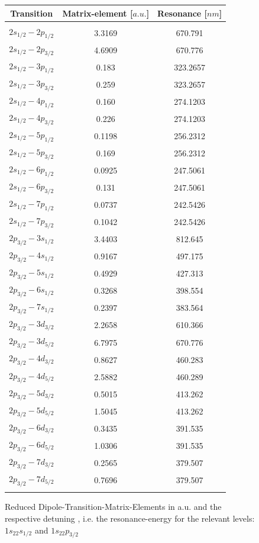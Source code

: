 \begin{figure}[H]
\begin{center}
\begin{tabular}{ccc}
Transition&Matrix-element [$\unit{a.u.}$]&Resonance [$\unit{nm}$]\\\hline\hline\\
$2s_{1/2}-2p_{1/2}$&3.3169&670.791\\
$2s_{1/2}-2p_{3/2}$&4.6909&670.776\\
$2s_{1/2}-3p_{1/2}$&0.183&323.2657\\
$2s_{1/2}-3p_{3/2}$&0.259&323.2657\\
$2s_{1/2}-4p_{1/2}$&0.160&274.1203\\
$2s_{1/2}-4p_{3/2}$&0.226&274.1203\\
$2s_{1/2}-5p_{1/2}$&0.1198&256.2312\\
$2s_{1/2}-5p_{3/2}$&0.169&256.2312\\
$2s_{1/2}-6p_{1/2}$&0.0925&247.5061\\
$2s_{1/2}-6p_{3/2}$&0.131&247.5061\\
$2s_{1/2}-7p_{1/2}$&0.0737&242.5426\\
$2s_{1/2}-7p_{3/2}$&0.1042&242.5426\\
$2p_{3/2}-3s_{1/2}$&3.4403&812.645\\
$2p_{3/2}-4s_{1/2}$&0.9167&497.175\\
$2p_{3/2}-5s_{1/2}$&0.4929&427.313\\
$2p_{3/2}-6s_{1/2}$&0.3268&398.554\\
$2p_{3/2}-7s_{1/2}$&0.2397&383.564\\
$2p_{3/2}-3d_{3/2}$&2.2658&610.366\\
$2p_{3/2}-3d_{5/2}$&6.7975&670.776\\
$2p_{3/2}-4d_{3/2}$&0.8627&460.283\\
$2p_{3/2}-4d_{5/2}$&2.5882&460.289\\
$2p_{3/2}-5d_{3/2}$&0.5015&413.262\\
$2p_{3/2}-5d_{5/2}$&1.5045&413.262\\
$2p_{3/2}-6d_{3/2}$&0.3435&391.535\\
$2p_{3/2}-6d_{5/2}$&1.0306&391.535\\
$2p_{3/2}-7d_{3/2}$&0.2565&379.507\\
$2p_{3/2}-7d_{5/2}$&0.7696&379.507\\\\\hline
\end{tabular}
\end{center}
\caption{Reduced Dipole-Transition-Matrix-Elements \cite{magic01} in a.u. and the respective detuning \cite{NIST_ASD}, i.e. the resonance-energy for the relevant levels: $1s_22s_{1/2}$ and $1s_22p_{3/2}$}
\label{matrixelements}
\end{figure}
